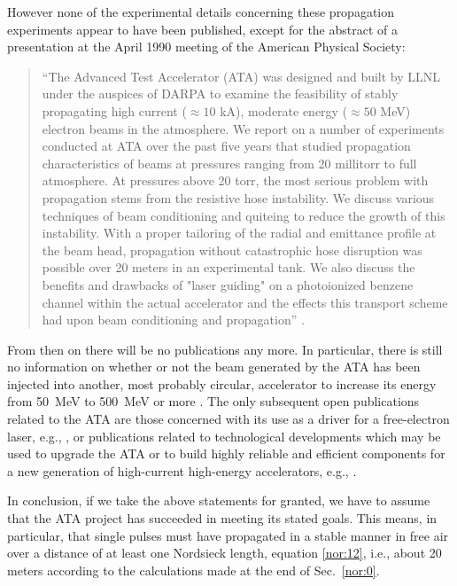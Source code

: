 \documentclass [12pt,a4paper,     ]{report} %
\begin{document}
However none of the experimental details concerning these propagation experiments appear to have been published, except for the abstract of a presentation at the April 1990 meeting of the American Physical Society:

\begin{quote}

``The Advanced Test Accelerator (ATA) was designed and built by LLNL under the auspices of DARPA to examine the feasibility of stably propagating high current ($\approx 10$ kA), moderate energy ($\approx 50$ MeV) electron beams in the atmosphere.  We report on a number of experiments conducted at ATA over the past five years that studied propagation characteristics of beams at pressures ranging from 20 millitorr to full atmosphere.  At pressures above 20 torr, the most serious problem with propagation stems from the resistive hose instability.  We discuss various techniques of beam conditioning and quiteing to reduce the growth of this instability.  With a proper tailoring of the radial and emittance profile at the beam head, propagation without catastrophic hose disruption was possible over 20 meters in an experimental tank.  We also discuss the benefits and drawbacks of "laser guiding" on a photoionized benzene channel within the actual accelerator and the effects this transport scheme had upon beam conditioning and propagation'' \cite{FAWLE1990-}.

\end{quote}
  

From then on there will be no publications any more.  In particular, there is still no information on whether or not the beam generated by the ATA has been injected into another, most probably circular, accelerator to increase its energy from 50~MeV to 500~MeV or more \cite{PETER1983-, HUI--1984B, PETIL1987-, KAPET1991-}.  The only subsequent open publications related to the ATA are those concerned with its use as a driver for a free-electron laser, e.g., \cite{BARLE1990-}, or publications related to technological developments which may be used to upgrade the ATA or to build highly reliable and efficient components for a new generation of high-current high-energy accelerators, e.g., \cite{HELLE1999-}.

In conclusion, if we take the above statements for granted, we have to assume that the ATA project has succeeded in meeting its stated goals.  This means, in particular, that single pulses must have propagated in a stable manner in free air over a distance of at least one Nordsieck length, equation \eqref{nor:12},  i.e., about 20 meters according to the calculations made at the end of Sec.~\ref{nor:0}.  
\end{document}
